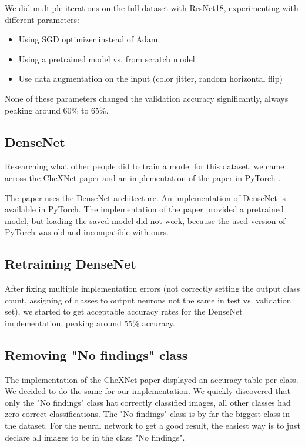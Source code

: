 We did multiple iterations on the full dataset with ResNet18, experimenting with different parameters:
\begin{itemize}
    \item Using SGD optimizer instead of Adam
    \item Using a pretrained model vs. from scratch model
    \item Use data augmentation on the input (color jitter, random horizontal flip)
\end{itemize}

None of these parameters changed the validation accuracy significantly, always peaking around 60\% to 65\%.

\subsection{DenseNet}

Researching what other people did to train a model for this dataset, we came across the CheXNet \cite{rajpurkar2017chexnet} paper and an implementation of the paper in PyTorch \cite{chexnetpytorch}.

The paper uses the DenseNet \cite{huang2017densely} architecture. An implementation of DenseNet is available in PyTorch. The implementation of the paper provided a pretrained model, but loading the saved model did not work, because the used version of PyTorch was old and incompatible with ours.

\subsection{Retraining DenseNet}

After fixing multiple implementation errors (not correctly setting the output class count, assigning of classes to output neurons not the same in test vs. validation set), we started to get acceptable accuracy rates for the DenseNet implementation, peaking around 55\% accuracy.

\subsection{Removing "No findings" class}
The implementation of the CheXNet paper displayed an accuracy table per class. We decided to do the same for our implementation. We quickly discovered that only the "No findings" class hat correctly classified images, all other classes had zero correct classifications. The "No findings" class is by far the biggest class in the dataset. For the neural network to get a good result, the easiest way is to just declare all images to be in the class "No findings".

